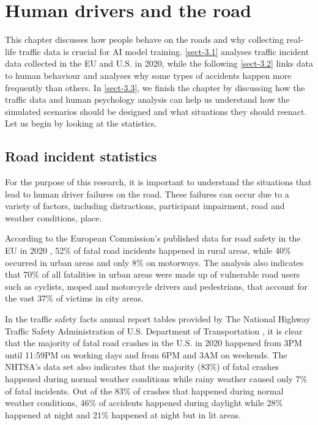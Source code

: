 \chapter{Human drivers and the road} \label{chap:three}

This chapter discusses how people behave on the roads and why collecting real-life traffic data is crucial for AI model training. \autoref{sect-3.1} analyses traffic incident data collected in the EU and U.S. in 2020, while the following \autoref{sect-3.2} links data to human behaviour and analyses why some types of accidents happen more frequently than others. In \autoref{sect-3.3}, we finish the chapter by discussing how the traffic data and human psychology analysis can help us understand how the simulated scenarios should be designed and what situations they should reenact. Let us begin by looking at the statistics.

\section{Road incident statistics} \label{sect-3.1}
For the purpose of this research, it is important to understand the situations that lead to human driver failures on the road. These failures can occur due to a variety of factors, including distractions, participant impairment, road and weather conditions, place.

According to the European Commission’s published data for road safety in the EU in 2020 \cite{eu_commision}, 52\% of fatal road incidents happened in rural areas, while 40\% occurred in urban areas and only 8\% on motorways. The analysis also indicates that 70\% of all fatalities in urban areas were made up of vulnerable road users such as cyclists, moped and motorcycle drivers and pedestrians, that account for the vast 37\% of victims in city areas.

In the traffic safety facts annual report tables provided by The National Highway Traffic Safety Administration of U.S. Department of Transportation \cite{nhtsa_data}, it is clear that the majority of fatal road crashes in the U.S. in 2020 happened from 3PM until 11:59PM on working days and from 6PM and 3AM on weekends. The NHTSA's data set also indicates that the majority (83\%) of fatal crashes happened during normal weather conditions while rainy weather caused only 7\% of fatal incidents. Out of the 83\% of crashes that happened during normal weather conditions, 46\% of accidents happened during daylight while 28\% happened at night and 21\% happened at night but in lit areas.

